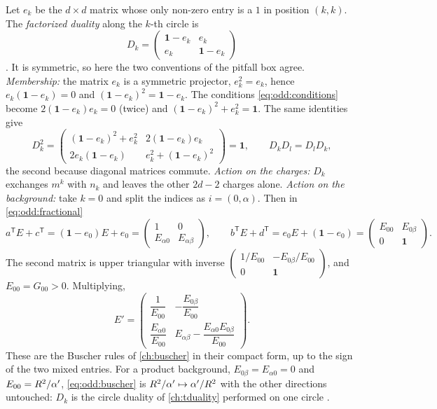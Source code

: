 Let $e_k$ be the $d\times d$ matrix whose only non-zero entry is a $1$ in position $(k,k)$.
The \emph{factorized duality} along the $k$-th circle is
\begin{equation}\label{eq:odd:factorized}
 D_k=\begin{pmatrix}\mathbf 1-e_k&e_k\\ e_k&\mathbf 1-e_k\end{pmatrix}
\end{equation}
. It is symmetric, so here the two
conventions of the pitfall box agree. \emph{Membership:} the matrix $e_k$ is a symmetric
projector, $e_k^2=e_k$, hence $e_k(\mathbf 1-e_k)=0$ and
$(\mathbf 1-e_k)^2=\mathbf 1-e_k$. The conditions \eqref{eq:odd:conditions} become
$2(\mathbf 1-e_k)e_k=0$ (twice) and $(\mathbf 1-e_k)^2+e_k^2=\mathbf 1$. The same
identities give
\begin{equation}\label{eq:odd:Dsquare}
 D_k^2=\begin{pmatrix}(\mathbf 1-e_k)^2+e_k^2&2(\mathbf 1-e_k)e_k\\
 2e_k(\mathbf 1-e_k)&e_k^2+(\mathbf 1-e_k)^2\end{pmatrix}=\mathbf 1,
 \qquad D_kD_l=D_lD_k ,
\end{equation}
the second because diagonal matrices commute. \emph{Action on the charges:} $D_k$ exchanges
$m^k$ with $n_k$ and leaves the other $2d-2$ charges alone. \emph{Action on the background:}
take $k=0$ and split the indices as $i=(0,\alpha)$. Then in \eqref{eq:odd:fractional}
\[
 a^{\mathsf T}E+c^{\mathsf T}=(\mathbf 1-e_0)E+e_0
 =\begin{pmatrix}1&0\\E_{\alpha0}&E_{\alpha\beta}\end{pmatrix},\qquad
 b^{\mathsf T}E+d^{\mathsf T}=e_0E+(\mathbf 1-e_0)
 =\begin{pmatrix}E_{00}&E_{0\beta}\\0&\mathbf 1\end{pmatrix}.
\]
The second matrix is upper triangular with inverse
$\left(\begin{smallmatrix}1/E_{00}&-E_{0\beta}/E_{00}\\0&\mathbf 1\end{smallmatrix}\right)$,
and $E_{00}=G_{00}>0$. Multiplying,
\begin{equation}\label{eq:odd:buscher}
 E'=\begin{pmatrix}\dfrac{1}{E_{00}}&-\dfrac{E_{0\beta}}{E_{00}}\\[3mm]
 \dfrac{E_{\alpha0}}{E_{00}}&E_{\alpha\beta}-\dfrac{E_{\alpha0}E_{0\beta}}{E_{00}}
 \end{pmatrix}.
\end{equation}
These are the Buscher rules of \cref{ch:buscher} in their compact
form, up to the sign of the two mixed entries. For a product background,
$E_{0\beta}=E_{\alpha0}=0$ and $E_{00}=R^2/\alpha'$, \eqref{eq:odd:buscher} is
$R^2/\alpha'\mapsto\alpha'/R^2$ with the other directions untouched: $D_k$ is the circle duality of
\cref{ch:tduality} performed on one circle .

